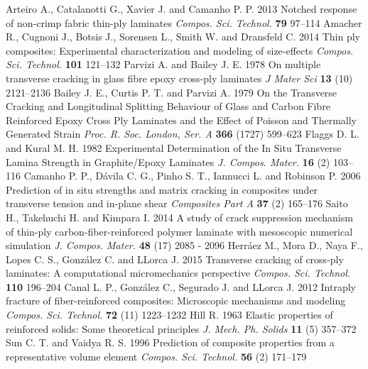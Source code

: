 \begin{thebibliography}{9}
 Arteiro A., Catalanotti G., Xavier J. and Camanho P. P. 2013 Notched response of non-crimp fabric thin-ply laminates {\it Compos. Sci. Technol.} {\bf 79} 97--114
Amacher R., Cugnoni J., Botsis J., Sorensen L., Smith W. and Dransfeld C. 2014 Thin ply composites: Experimental characterization and modeling of size-effects {\it Compos. Sci. Technol.} {\bf 101} 121--132
Parvizi A. and Bailey J. E. 1978 On multiple transverse cracking in glass fibre epoxy cross-ply laminates {\it J Mater Sci} {\bf 13} (10) 2121--2136
Bailey J. E., Curtis P. T. and Parvizi A. 1979 On the Transverse Cracking and Longitudinal Splitting Behaviour of Glass and Carbon Fibre Reinforced Epoxy Cross Ply Laminates and the Effect of Poisson and Thermally Generated Strain {\it Proc. R. Soc. London, Ser. A} {\bf 366} (1727) 599--623
Flaggs D. L. and Kural M. H. 1982 Experimental Determination of the In Situ Transverse Lamina Strength in Graphite/Epoxy Laminates {\it J. Compos. Mater.} {\bf 16} (2) 103--116
Camanho P. P., D\'avila C. G., Pinho S. T., Iannucci L. and Robinson P. 2006 Prediction of in situ strengths and matrix cracking in composites under transverse tension and in-plane shear {\it Composites Part A} {\bf 37} (2) 165–176
Saito H., Takehuchi H. and Kimpara I. 2014 A study of crack suppression mechanism of thin-ply carbon-fiber-reinforced polymer laminate with mesoscopic numerical simulation {\it J. Compos. Mater.} {\bf 48} (17) 2085 - 2096
Herr\'aez M., Mora D., Naya F., Lopes C. S., Gonz\'alez C. and LLorca J. 2015 Transverse cracking of cross-ply laminates: A computational micromechanics perspective {\it Compos. Sci. Technol.} {\bf 110} 196--204
Canal L. P., Gonz\'alez C., Segurado J. and LLorca J. 2012 Intraply fracture of fiber-reinforced composites: Microscopic mechanisms and modeling {\it Compos. Sci. Technol.} {\bf 72} (11) 1223--1232
Hill R. 1963 Elastic properties of reinforced solids: Some theoretical principles {\it J. Mech. Ph. Solids} {\bf 11} (5) 357--372
Sun C. T. and Vaidya R. S. 1996 Prediction of composite properties from a representative volume element {\it Compos. Sci. Technol.} {\bf 56} (2) 171--179

\end{thebibliography}
